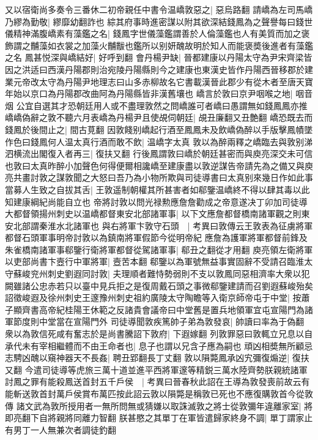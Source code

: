 又以宿衛尚多奏令三番休二初帝親任中書令温嶠敦惡之|{
	惡烏路翻}
請嶠為左司馬嶠乃繆為勤敬|{
	繆靡幼翻詐也}
綜其府事時進密謀以附其欲深結錢鳳為之聲譽每曰錢世儀精神滿腹嶠素有藻鑑之名|{
	錢鳳字世儀藻鑑謂善於人倫藻鑑也人有美質而加之褒飾謂之黼藻如衣裳之加藻火黼黻也鑑所以别妍醜故明於知人而能褒奬後進者有藻鑑之名}
鳳甚悦深與嶠結好|{
	好呼到翻}
會丹楊尹缺|{
	晉都建康以丹陽太守為尹宋齊梁皆因之洪适曰西漢丹陽郡則治宛陵丹陽縣則今之建康也東漢史皆作丹陽西晉移郡於建業元帝改太守為丹陽尹地理志曰山多赤柳故名它書載漢晉此郡少有從木者至唐天寶年始以京口為丹陽郡改曲阿為丹陽縣皆非漢舊壤也}
嶠言於敦曰京尹咽喉之地|{
	咽音烟}
公宜自選其才恐朝廷用人或不盡理敦然之問嶠誰可者嶠曰愚謂無如錢鳳鳳亦推嶠嶠偽辭之敦不聽六月表嶠為丹楊尹且使覘伺朝廷|{
	覘丑廉翻又丑艶翻}
嶠恐既去而錢鳳於後間止之|{
	間古莧翻}
因敦餞别嶠起行酒至鳳鳳未及飲嶠偽醉以手版擊鳳幘墜作色曰錢鳳何人温太真行酒而敢不飲|{
	温嶠字太真}
敦以為醉兩釋之嶠臨去與敦别涕泗横流出閣復入者再三|{
	復扶又翻}
行後鳳謂敦曰嶠於朝廷甚密而與庾亮深交未可信也敦曰太真昨醉小加聲色何得便爾相讒嶠至建康盡以敦逆謀告帝請先為之備又與庾亮共畫討敦之謀敦聞之大怒曰吾乃為小物所欺與司徒導書曰太真别來幾日作如此事當募人生致之自拔其舌|{
	王敦遥制朝權其所甚害者如郗鑒温嶠終不得以肆其毒以此知建康綱紀尚能自立也}
帝將討敦以問光禄勲應詹詹勸成之帝意遂决丁卯加司徒導大都督領揚州刺史以温嶠都督東安北部諸軍事|{
	以下文應詹都督橋南諸軍觀之則東安北部謂秦淮水北諸軍也}
與右將軍卞敦守石頭　|{
	考異曰敦傳云王敦表為征虜將軍都督石頭軍事明帝討敦以為鎮南將軍假節今從明帝紀}
應詹為護軍將軍都督前鋒及朱雀橋南諸軍事郗鑒行衛將軍都督從駕諸軍事|{
	郗丑之翻從才用翻}
庾亮領左衛將軍以吏部尚書卞壼行中軍將軍|{
	壼苦本翻}
郗鑒以為軍號無益事實固辭不受請召臨淮太守蘇峻兖州刺史劉遐同討敦|{
	夫理順者難恃勢弱則不支以敦鳳同惡相濟率大衆以犯闕雖諸公忠赤若只以臺中見兵拒之是復周戴石頭之事微郗鑒建請而召劉遐蘇峻殆矣}
詔徵峻遐及徐州刺史王邃豫州刺史祖約廣陵太守陶瞻等入衛京師帝屯于中堂|{
	按蕭子顯齊書高帝紀桂陽王休範之反諸貴會議帝曰中堂舊是置兵地領軍宜屯宣陽門為諸軍節度則中堂當在宣陽門外}
司徒導聞敦疾篤帥子弟為敦發哀|{
	帥讀曰率為于偽翻}
衆以為敦信死咸有奮志於是尚書騰詔下敦府|{
	下遐嫁翻}
列敦罪惡曰敦輒立兄息以自承代未有宰相繼體而不由王命者也|{
	息子也謂以兄含子應為嗣也}
頑凶相奬無所顧忌志騁凶醜以窺神器天不長姦|{
	聘丑郢翻長丁丈翻}
敦以隕斃鳳承凶宄彌復煽逆|{
	復扶又翻}
今遣司徒導等虎旅三萬十道並進平西將軍邃等精鋭三萬水陸齊勢朕親統諸軍討鳳之罪有能殺鳳送首封五千戶侯　|{
	考異曰晉春秋此詔在王導為敦發喪前故云有能斬送敦首封萬戶侯賞布萬匹按此詔云敦以隕斃是稱敦已死也不應復購敦首今從敦傳}
諸文武為敦所授用者一無所問無或猜嫌以取誅滅敦之將士從敦彌年違離家室|{
	將即亮翻下自將親將同離力智翻}
朕甚愍之其單丁在軍皆遣歸家終身不調|{
	單丁謂家止有男丁一人無兼次者調徒釣翻}
